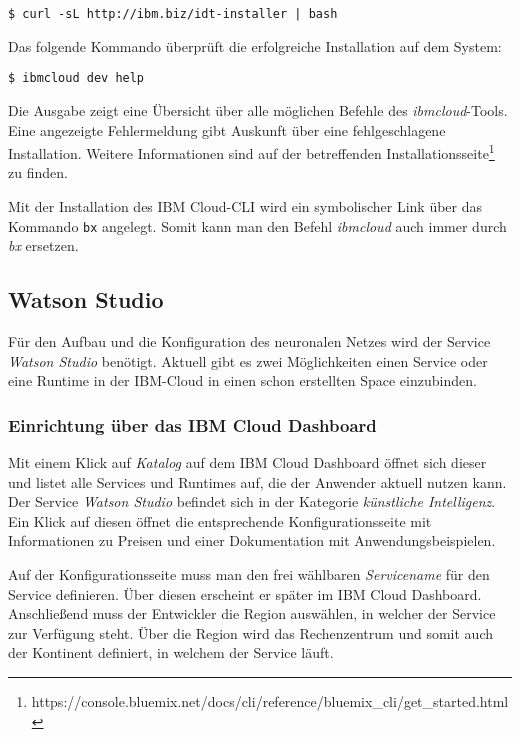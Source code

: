 \begin{lstlisting}[caption=Installation des IBM Cloud CLI, label=ls:vorbereitung_ibmcli]
    $ curl -sL http://ibm.biz/idt-installer | bash
\end{lstlisting}

Das folgende Kommando überprüft die erfolgreiche Installation auf dem System:

\begin{lstlisting}[caption=Installation des CLI überprüfen, label=ls:vorbereitung_ibmclitest]
    $ ibmcloud dev help
\end{lstlisting}

Die Ausgabe zeigt eine Übersicht über alle möglichen Befehle des \textit{ibmcloud}-Tools. Eine angezeigte Fehlermeldung
gibt Auskunft über eine fehlgeschlagene Installation. Weitere Informationen sind auf der betreffenden
Installationsseite\footnote{https://console.bluemix.net/docs/cli/reference/bluemix\_cli/get\_started.html} zu finden.

Mit der Installation des IBM Cloud-CLI wird ein symbolischer Link über das Kommando \texttt{bx} angelegt. Somit kann man
den Befehl \textit{ibmcloud} auch immer durch \textit{bx} ersetzen.

\subsection{Watson Studio}
Für den Aufbau und die Konfiguration des neuronalen Netzes wird der Service \textit{Watson Studio} benötigt. Aktuell
gibt es zwei Möglichkeiten einen Service oder eine Runtime in der IBM-Cloud in einen schon erstellten Space einzubinden.

\subsubsection{Einrichtung über das IBM Cloud Dashboard}
Mit einem Klick auf \textit{Katalog} auf dem IBM Cloud Dashboard öffnet sich dieser und listet alle Services und
Runtimes auf, die der Anwender aktuell nutzen kann. Der Service \textit{Watson Studio} befindet sich in der Kategorie
\textit{künstliche Intelligenz}. Ein Klick auf diesen öffnet die entsprechende Konfigurationsseite mit Informationen zu
Preisen und einer Dokumentation mit Anwendungsbeispielen.

Auf der Konfigurationsseite muss man den frei wählbaren \textit{Servicename} für den Service definieren. Über diesen
erscheint er später im IBM Cloud Dashboard. Anschließend muss der Entwickler die Region auswählen, in welcher der
Service zur Verfügung steht. Über die Region wird das Rechenzentrum und somit auch der Kontinent definiert, in welchem
der Service läuft.

